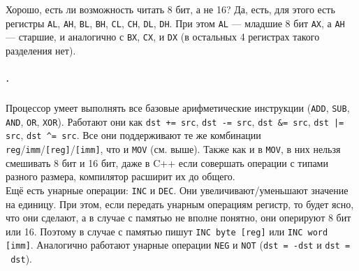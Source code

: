 \documentclass{article}
\newcommand{\asm}[1]{\texttt{#1}}
\begin{document}
    Хорошо, есть ли возможность читать 8 бит, а не 16? Да, есть, для этого есть регистры \asm{AL}, \asm{AH}, \asm{BL}, \asm{BH}, \asm{CL}, \asm{CH}, \asm{DL}, \asm{DH}. При этом \asm{AL} --- младшие 8 бит \asm{AX}, а \asm{AH} --- старшие, и аналогично с \asm{BX}, \asm{CX}, и \asm{DX} (в остальных 4 регистрах такого разделения нет).
    \subparagraph{.}
    Процессор умеет выполнять все базовые арифметические инструкции (\asm{ADD}, \asm{SUB}, \asm{AND}, \asm{OR}, \asm{XOR}). Работают они как \texttt{dst += src}, \texttt{dst -= src}, \texttt{dst &= src}, \texttt{dst |= src}, \texttt{dst ^= src}. Все они поддерживают те же комбинации \asm{reg}/\asm{imm}/\asm{[reg]}/\asm{[imm]}, что и \asm{MOV} (см. выше). Также как и в \asm{MOV}, в них нельзя смешивать 8 бит и 16 бит, даже в C++ если совершать операции с типами разного размера, компилятор расширит их до общего.\\
    Ещё есть унарные операции: \asm{INC} и \asm{DEC}. Они увеличивают/уменьшают значение на единицу. При этом, если передать унарным операциям регистр, то будет ясно, что они сделают, а в случае с памятью не вполне понятно, они оперируют 8 бит или 16. Поэтому в случае с памятью пишут \asm{INC byte [reg]} или \asm{INC word [imm]}. Аналогично работают унарные операции \asm{NEG} и \asm{NOT} (\texttt{dst = -dst} и \texttt{dst = ~dst}).\\
\end{document}
